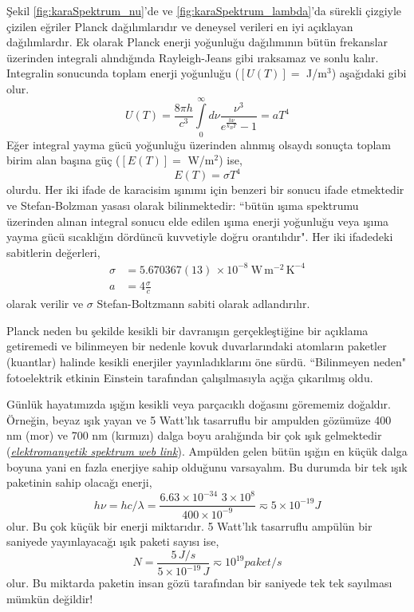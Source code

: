 \documentclass[00_kitap.tex]{subfiles}
\begin{document}
Şekil \ref{fig:karaSpektrum_nu}'de ve \ref{fig:karaSpektrum_lambda}'da sürekli çizgiyle çizilen eğriler Planck dağılımlarıdır ve deneysel verileri en iyi açıklayan dağılımlardır. Ek olarak Planck enerji yoğunluğu dağılımının bütün frekanslar üzerinden integrali alındığında Rayleigh-Jeans gibi ıraksamaz ve sonlu kalır. Integralin sonucunda toplam enerji yoğunluğu ($[U(T)]=$ J/m$^3$) aşağıdaki gibi olur.
\begin{equation}
\label{eq:Planck_U_total}
U(T) = \frac{8 \pi h}{c^{3}} \int\limits_0^\infty d\nu \frac{\nu^{3}}{e^{\frac{h \nu}{k_{B} T}} - 1} = a T^4
\end{equation}
Eğer integral yayma gücü yoğunluğu üzerinden alınmış olsaydı sonuçta toplam birim alan başına güç ($[E(T)]=$ W/m$^2$) ise,
\begin{equation}
\label{eq:Planck_E_total}
E(T) = \sigma T^4
\end{equation}
olurdu. Her iki ifade de karacisim ışınımı için benzeri bir sonucu ifade etmektedir ve Stefan-Bolzman yasası olarak bilinmektedir: ``bütün ışıma spektrumu üzerinden alınan integral sonucu elde edilen ışıma enerji yoğunluğu veya ışıma yayma gücü sıcaklığın dördüncü kuvvetiyle doğru orantılıdır". Her iki ifadedeki sabitlerin değerleri,
\begin{align}
\label{eq:stefan_boltzman}
\sigma &=  5.670367(13) \, \times 10^{-8}\ \textrm{W}\,\textrm{m}^{-2}\,\textrm{K}^{-4} \\
a &= 4\frac{\sigma}{c} \nonumber
\end{align}
olarak verilir ve $\sigma$ Stefan-Boltzmann sabiti \cite{codata:stefan_boltzman} olarak adlandırılır.


Planck neden bu şekilde kesikli bir davranışın gerçekleştiğine bir açıklama getiremedi ve bilinmeyen bir nedenle kovuk duvarlarındaki atomların paketler (kuantlar) halinde kesikli enerjiler yayınladıklarını öne sürdü. ``Bilinmeyen neden" fotoelektrik etkinin Einstein tarafından çalışılmasıyla açığa çıkarılmış oldu.

Günlük hayatımızda ışığın kesikli veya parçacıklı doğasını görememiz doğaldır. Örneğin, beyaz ışık yayan ve 5 Watt'lık tasarruflu bir ampulden gözümüze 400 nm (mor) ve 700 nm (kırmızı) dalga boyu aralığında bir çok ışık gelmektedir ({\it \href {https://upload.wikimedia.org/wikipedia/commons/2/25/Electromagnetic-Spectrum.svg}{elektromanyetik spektrum web link}}). Ampülden gelen bütün ışığın en küçük dalga boyuna yani en fazla enerjiye sahip olduğunu varsayalım. Bu durumda bir tek ışık paketinin sahip olacağı enerji,
\begin{equation}
\label{eq:example_light_quanta01}
h\nu = h c/\lambda = \frac{6.63\times10^{-34}\,\,3\times10^{8}}{400\times10^{-9}} \eqsim 5\times 10^{-19} J 
\end{equation}
olur. Bu çok küçük bir enerji miktarıdır. 5 Watt'lık tasarruflu ampülün bir saniyede yayınlayacağı ışık paketi sayısı ise,
\begin{equation}
\label{eq:example_light_quanta02}
N = \frac{5\,J/s}{5\times10^{-19}\,J} \eqsim 10^{19} paket/s
\end{equation}
olur. Bu miktarda paketin insan gözü tarafından bir saniyede tek tek sayılması mümkün değildir!
\end{document}
